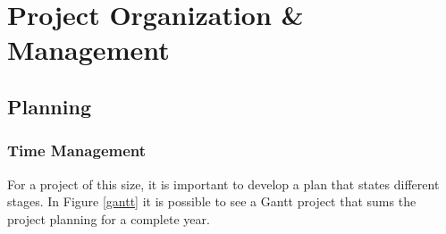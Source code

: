 \section{Project Organization \& Management}

\subsection{Planning}

\subsubsection{Time Management}

For a project of this size, it is important to develop a plan that states
different stages. In Figure \ref{gantt} it is possible to see a Gantt project
that sums the project planning for a complete year.\\

